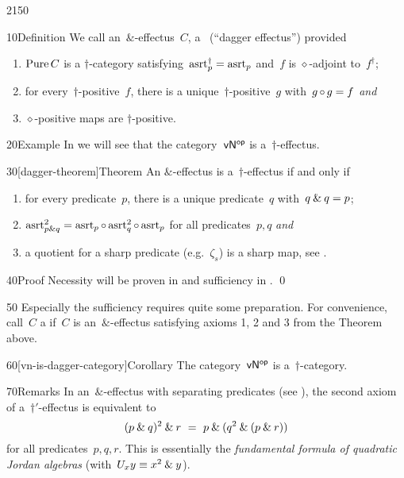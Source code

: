 \begin{parsec}{2150}%
\begin{point}{10}{Definition}%
We call an~$\&$-effectus~$C$,
    a~ (``dagger effectus'') provided
\begin{enumerate}
\item
    $\operatorname{Pure} C$ is a  $\dagger$-category
     satisfying~$\mathrm{asrt}_p^\dagger = \mathrm{asrt}_p$
        and~$f$ is $\diamond$-adjoint to~$f^\dagger$;
\item
    for every~$\dagger$-positive~$f$,
        there is a unique~$\dagger$-positive~$g$
        with~$g \mathop{\circ} g = f$ \emph{and}
\item
    $\diamond$-positive maps are $\dagger$-positive.
\end{enumerate}
\end{point}
\begin{point}{20}{Example}%
In 
we will see that the category~${\mathsf{vN}}{^{\mathsf{op}}}$ is a~$\dagger$-effectus.
\end{point}
\begin{point}{30}[dagger-theorem]{Theorem}%
    An $\&$-effectus
        is a~$\dagger$-effectus if and only if
\begin{enumerate}
\item
for every predicate~$p$, there is a unique predicate~$q$
    with~$q \mathbin{\&} q = p$;
\item
    $\mathrm{asrt}^2_{p \mathbin{\&} q}
        = \mathrm{asrt}_p \mathop{\circ} \mathrm{asrt}^2_q \mathop{\circ} \mathrm{asrt}_p$
     for all predicates~$p,q$ \emph{and}
\item
    a quotient for a sharp predicate (e.g.~$\zeta_s$)
    is a sharp map, see .
\end{enumerate}
\begin{point}{40}{Proof}%
Necessity will be proven in
        and sufficiency in . \qed
\end{point}
\begin{point}{50}%
Especially the sufficiency requires quite some preparation.
For convenience, call~$C$ a 
    if~$C$ is an~$\&$-effectus
    satisfying axioms 1, 2 and 3 from the Theorem above.
\end{point}
\begin{point}{60}[vn-is-dagger-category]{Corollary}%
The category~${\mathsf{vN}}{^{\mathsf{op}}}$ is a~$\dagger$-category.
\end{point}
\begin{point}{70}{Remarks}%
    In an~$\&$-effectus
    with separating predicates
    (see ),
    the second axiom of a~$\dagger'$-effectus is equivalent
    to
\begin{equation*}
    (p \mathbin{\&} q)^2 \mathbin{\&} r
    \ =\  p \mathbin{\&} (q^2 \mathbin{\&} (p \mathbin{\&} r))
\end{equation*}
    for all predicates~$p,q,r$.
This is essentially the \emph{fundamental formula
    of quadratic Jordan algebras} \cite[\S 4.2]{mccrimmon2006taste}
    (with~$U_x y \equiv x^2 \mathbin{\&} y$).


\end{point}
\end{point}
\end{parsec}
